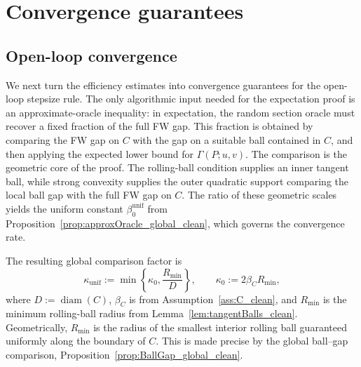 \documentclass{article}
\DeclareMathOperator{\diam}{diam}
\begin{document}
\section{Convergence guarantees}
\subsection{Open-loop convergence}
\label{sec:open_loop}

We next turn the efficiency estimates into convergence guarantees for the
open-loop stepsize rule. The only algorithmic input needed for the expectation
proof is an approximate-oracle inequality: in expectation, the random section
oracle must recover a fixed fraction of the full FW gap. This fraction is
obtained by comparing the FW gap on \(C\) with the gap on a suitable ball
contained in \(C\), and then applying the expected lower bound for
\(\Gamma(P;u,v)\). The comparison is the geometric core of the proof. The rolling-ball condition
supplies an inner tangent ball, while strong convexity supplies the outer
quadratic support comparing the local ball gap with the full FW gap on \(C\).
The ratio of these geometric scales yields the uniform constant
\(\beta_0^{\mathrm{unif}}\) from
Proposition~\ref{prop:approxOracle_global_clean}, which governs the convergence
rate.

The resulting global comparison factor is
\begin{equation}
\kappa_{\mathrm{unif}}
:=
\min\!\left\{\kappa_0,\frac{R_{\min}}{D}\right\},
\qquad
\kappa_0:=2\beta_C R_{\min},
\label{eq:kappa_unif_main}
\end{equation}
where $D:=\diam(C)$, $\beta_C$ is from Assumption~\ref{ass:C_clean}, and $R_{\min}$ is the minimum rolling-ball radius from Lemma~\ref{lem:tangentBalls_clean}. Geometrically, \(R_{\min}\) is the radius of the smallest interior rolling ball
guaranteed uniformly along the boundary of \(C\). This is made precise by the global ball--gap comparison,
Proposition~\ref{prop:BallGap_global_clean}.
\end{document}
